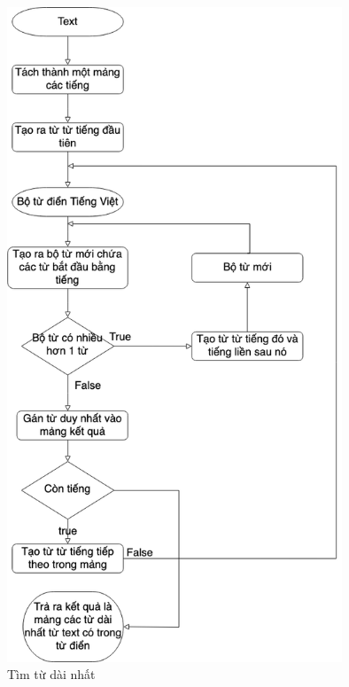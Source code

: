 \begin{figure}[htp]
    \centering
    \includegraphics[width=10cm]{images/Diagram-longest-word.png}
    \caption{Tìm từ dài nhất}
    \label{fig:longest-word}
\end{figure}
